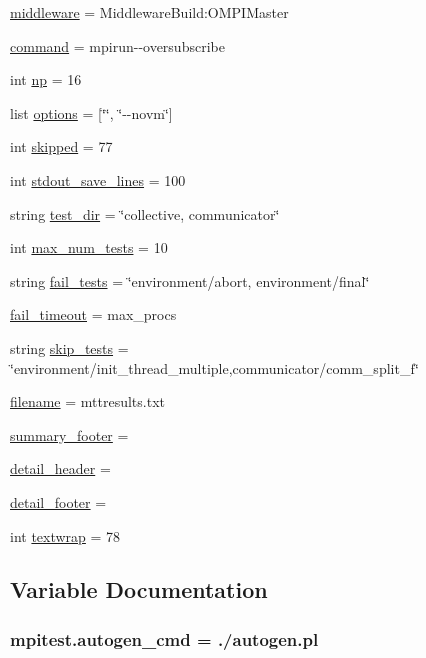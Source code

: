 \begin{DoxyCompactItemize}
\item 
\hyperlink{namespacempitest_abda8feed4cda165ed145590c0c693826}{middleware} = Middleware\-Build\-:\-O\-M\-P\-I\-Master
\item 
\hyperlink{namespacempitest_a47e2cc8f7e7a5ee1717d68777fd3c363}{command} = mpirun-\/-\/oversubscribe
\item 
int \hyperlink{namespacempitest_ae35dc1081e40dfe24adccbc698417a69}{np} = 16
\item 
list \hyperlink{namespacempitest_a91cdfabf3b22da570c284023ab54044f}{options} = \mbox{[}\char`\"{}\char`\"{}, \char`\"{}-\/-\/novm\char`\"{}\mbox{]}
\item 
int \hyperlink{namespacempitest_a85870f11cfd9d17b34964ec12302c3bb}{skipped} = 77
\item 
int \hyperlink{namespacempitest_a4a75d79ba591224da573cc9ab62552b6}{stdout\-\_\-save\-\_\-lines} = 100
\item 
string \hyperlink{namespacempitest_afb14b0cb9c4139a5d3f2bf30599704ab}{test\-\_\-dir} = \char`\"{}collective, communicator\char`\"{}
\item 
int \hyperlink{namespacempitest_aa789c1fae4dda8997bf0f7d9a794f877}{max\-\_\-num\-\_\-tests} = 10
\item 
string \hyperlink{namespacempitest_a6fd83076e5878f8964800690579327d8}{fail\-\_\-tests} = \char`\"{}environment/abort, environment/final\char`\"{}
\item 
\hyperlink{namespacempitest_a54920d94a964e18fe3ad81cbe8363c36}{fail\-\_\-timeout} = max\-\_\-procs
\item 
string \hyperlink{namespacempitest_ac08f02520db8234e89010050fa3b76ea}{skip\-\_\-tests} = \char`\"{}environment/init\-\_\-thread\-\_\-multiple,communicator/comm\-\_\-split\-\_\-f\char`\"{}
\item 
\hyperlink{namespacempitest_a7b80601152b8c206cc61614fcd09929a}{filename} = mttresults.\-txt
\item 
\hyperlink{namespacempitest_a982b2dded1406d02564695cb5e756197}{summary\-\_\-footer} =
\item 
\hyperlink{namespacempitest_a55ff433403a926c608140ebd229f138a}{detail\-\_\-header} =
\item 
\hyperlink{namespacempitest_a3f742d28fd4486162a251a03685b28d0}{detail\-\_\-footer} =
\item 
int \hyperlink{namespacempitest_a4ff3a6f6296976b6e0ed6249357c3542}{textwrap} = 78
\end{DoxyCompactItemize}


\subsection{Variable Documentation}
\hypertarget{namespacempitest_a216b951ce28d23d25761486f09fdafa5}{
\subsubsection[{autogen\-\_\-cmd}]{\setlength{\rightskip}{0pt plus 5cm}mpitest.\-autogen\-\_\-cmd = ./autogen.\-pl}}\label{namespacempitest_a216b951ce28d23d25761486f09fdafa5}


